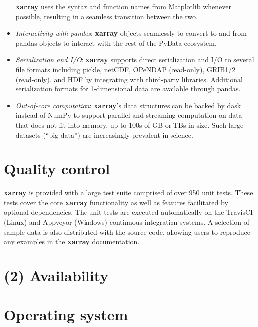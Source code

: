 \documentclass{jors}
\begin{document}
\begin{itemize}
	\textbf{xarray} uses the syntax and function names from Matplotlib whenever possible, resulting in a seamless transition between the two.
	\item \textit{Interactivity with pandas}: \textbf{xarray} objects seamlessly to convert to and from pandas objects to interact with the rest of the PyData ecosystem.
	\item \textit{Serialization and I/O}: \textbf{xarray} supports direct serialization and I/O to several file formats including pickle, netCDF, OPeNDAP (read-only), GRIB1/2 (read-only), and HDF by integrating with third-party libraries.
	Additional serialization formats for 1-dimensional data are available through pandas.
	\item \textit{Out-of-core computation}: \textbf{xarray}'s data structures can be backed by dask \cite{dask} instead of NumPy to support parallel and streaming computation on data that does not fit into memory, up to 100s of GB or TBs in size. Such large datasets (``big data'') are increasingly prevalent in science.
\end{itemize}

\section*{Quality control}


\textbf{xarray} is provided with a large test suite comprised of over 950 unit tests.
These tests cover the core \textbf{xarray} functionality as well as features facilitated by optional dependencies.
The unit tests are executed automatically on the TravisCI (Linux) \citep{TravisCI} and Appveyor (Windows) \citep{Appveyor} continuous integration systems.
A selection of sample data is also distributed with the source code, allowing users to reproduce any examples in the \textbf{xarray} documentation.

\section*{(2) Availability}
\vspace{0.5cm}
\section*{Operating system}
\end{document}
